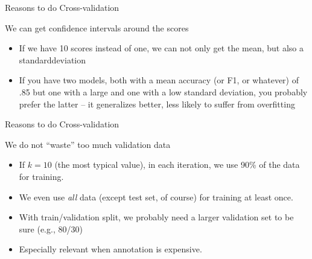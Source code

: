 \begin{frame}{Reasons to do Cross-validation}
  \begin{block}{We can get confidence intervals around the scores}
    \begin{itemize}
    \item If we have 10 scores instead of one, we can not only get the mean, but also a standarddeviation
    \item If you have two models, both with a mean accuracy (or F1, or whatever) of .85 but one with a large and one with a low standard deviation, you probably prefer the latter -- it generalizes better, less likely to suffer from overfitting
    \end{itemize}	
  \end{block}
  
\end{frame}






\begin{frame}{Reasons to do Cross-validation}
  \begin{block}{We do not ``waste'' too much validation data}
    \begin{itemize}
    \item If $k=10$ (the most typical value), in each iteration, we use 90\% of the data for training.
    \item We even use \emph{all} data (except test set, of course) for training at least once.
    \item With train/validation split, we probably need a larger validation set to be sure (e.g., 80/30)
    \item Especially relevant when annotation is expensive.
    \end{itemize}
  \end{block}
\end{frame}



